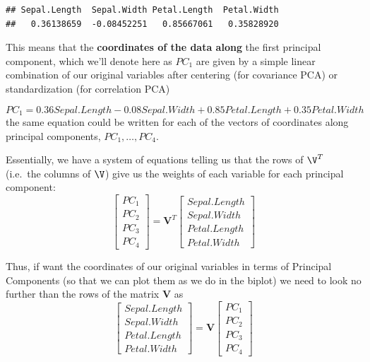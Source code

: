 \documentclass[
]{article}
\newenvironment{Shaded}{\begin{snugshade}}{\end{snugshade}}
\newcommand{\DecValTok}[1]{\textcolor[rgb]{0.00,0.00,0.81}{#1}}
\newcommand{\NormalTok}[1]{#1}
\newcommand{\SpecialCharTok}[1]{\textcolor[rgb]{0.00,0.00,0.00}{#1}}
\theoremstyle{definition}
\theoremstyle{definition}
\theoremstyle{definition}
\theoremstyle{definition}
\theoremstyle{remark}
\begin{document}
\begin{Shaded}
\end{Shaded}

\begin{verbatim}
## Sepal.Length  Sepal.Width Petal.Length  Petal.Width 
##   0.36138659  -0.08452251   0.85667061   0.35828920
\end{verbatim}

This means that the \textbf{coordinates of the data along} the first principal component, which we'll denote here as \(PC_1\) are given by a simple linear combination of our original variables after centering (for covariance PCA) or standardization (for correlation PCA)

\[PC_1 = 0.36Sepal.Length-0.08Sepal.Width+0.85Petal.Length +0.35Petal.Width\]
the same equation could be written for each of the vectors of coordinates along principal components, \(PC_1,\dots, PC_4\).

Essentially, we have a system of equations telling us that the rows of \(\V^T\) (i.e.~the columns of \(\V\)) give us the weights of each variable for each principal component:
\begin{equation}
\label{eq:cpc1}
\begin{bmatrix} PC_1\\PC_2\\PC_3\\PC_4\end{bmatrix} = \mathbf{V}^T\begin{bmatrix}Sepal.Length\\Sepal.Width\\Petal.Length\\Petal.Width\end{bmatrix}
\end{equation}

Thus, if want the coordinates of our original variables in terms of Principal Components (so that we can plot them as we do in the biplot) we need to look no further than the rows of the matrix \(\mathbf{V}\) as
\begin{equation}
\label{eq:cpc2}
\begin{bmatrix}Sepal.Length\\Sepal.Width\\Petal.Length\\Petal.Width\end{bmatrix} =\mathbf{V}\begin{bmatrix} PC_1\\PC_2\\PC_3\\PC_4\end{bmatrix}
\end{equation}
\end{document}

